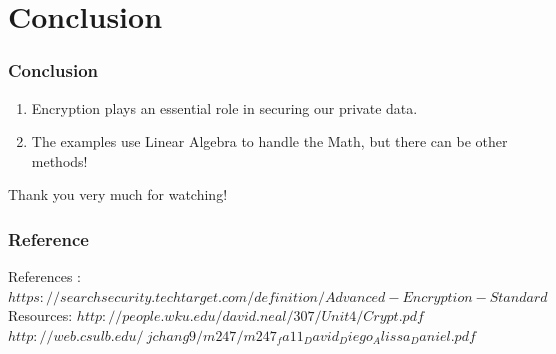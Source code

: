\documentclass[11pt]{beamer}
\begin{document}
\section{Conclusion}
\begin{frame}\frametitle{Conclusion}
	\begin{enumerate}[]
	\item Encryption plays an essential role in securing our private data.
	\item The examples use Linear Algebra to handle the Math, but there can be other methods!
	\end{enumerate}
\end{frame}

\begin{frame}
	\center Thank you very much for watching!
\end{frame}

\begin{frame}\frametitle{Reference}
References :
	$https://searchsecurity.techtarget.com/definition/Advanced-Encryption-Standard$
Resources:
	$http://people.wku.edu/david.neal/307/Unit4/Crypt.pdf$
	$http://web.csulb.edu/~jchang9/m247/m247_fa11_David_Diego_Alissa_Daniel.pdf$

\end{frame}
\end{document}
